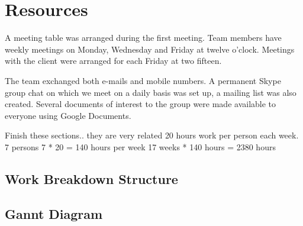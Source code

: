 \newpage
\section{Resources}
A meeting table was arranged during the first meeting. Team members
have weekly meetings on Monday, Wednesday and Friday at twelve o'clock.
Meetings with the client were arranged for each Friday at two fifteen.

The team exchanged both e-mails and mobile numbers. A permanent Skype
group chat on which we meet on a daily basis was set up, a mailing
list was also created. Several documents of interest to the group
were made available to everyone using Google Documents.

\todo
{
 Finish these sections.. they are very related
}
20 hours work per person each week.
7 persons
7 * 20 = 140 hours per week
17 weeks * 140 hours = 2380 hours

\subsection{Work Breakdown Structure}


\subsection{Gannt Diagram}

